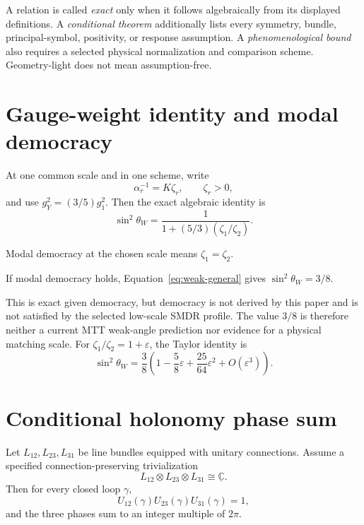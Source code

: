 \documentclass[11pt]{article}
\begin{document}
A relation is called \emph{exact} only when it follows algebraically from its
displayed definitions. A \emph{conditional theorem} additionally lists every
symmetry, bundle, principal-symbol, positivity, or response assumption. A
\emph{phenomenological bound} also requires a selected physical normalization
and comparison scheme. Geometry-light does not mean assumption-free.

\section{Gauge-weight identity and modal democracy}

At one common scale and in one scheme, write
\[
\alpha_r^{-1}=K\zeta_r,
\qquad \zeta_r>0,
\]
and use $g_Y^2=(3/5)g_1^2$. Then the exact algebraic identity is
\begin{equation}
\boxed{\sin^2\theta_W
=\frac{1}{1+(5/3)(\zeta_1/\zeta_2)}.}
\label{eq:weak-general}
\end{equation}

\begin{definition}
Modal democracy at the chosen scale means $\zeta_1=\zeta_2$.
\end{definition}

\begin{corollary}
If modal democracy holds, Equation~\eqref{eq:weak-general} gives
$\sin^2\theta_W=3/8$.
\end{corollary}

This is exact given democracy, but democracy is not derived by this paper and
is not satisfied by the selected low-scale SMDR profile. The value $3/8$ is
therefore neither a current MTT weak-angle prediction nor evidence for a
physical matching scale. For
$\zeta_1/\zeta_2=1+\varepsilon$, the Taylor identity is
\[
\sin^2\theta_W=\frac38\left(1-\frac58\varepsilon
+\frac{25}{64}\varepsilon^2+O(\varepsilon^3)\right).
\]

\section{Conditional holonomy phase sum}

\begin{theorem}
Let $L_{12},L_{23},L_{31}$ be line bundles equipped with unitary connections.
Assume a specified connection-preserving trivialization
\[
L_{12}\otimes L_{23}\otimes L_{31}\cong\underline{\mathbb C}.
\]
Then for every closed loop $\gamma$,
\[
U_{12}(\gamma)U_{23}(\gamma)U_{31}(\gamma)=1,
\]
and the three phases sum to an integer multiple of $2\pi$.
\end{theorem}
\end{document}
